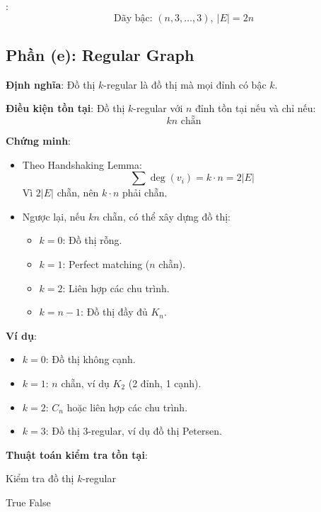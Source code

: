 \documentclass[a4paper,12pt]{article}
\theoremstyle{plain}
\theoremstyle{definition}
\begin{document}
:
\[
\boxed{\text{Dãy bậc: } (n, 3, \ldots, 3), \ |E| = 2n}
\]

\subsection*{Phần (e): Regular Graph}

\textbf{Định nghĩa}: Đồ thị \( k \)-regular là đồ thị mà mọi đỉnh có bậc \( k \).

\textbf{Điều kiện tồn tại}: Đồ thị \( k \)-regular với \( n \) đỉnh tồn tại nếu và chỉ nếu:
\[
kn \text{ chẵn}
\]

\textbf{Chứng minh}:
\begin{itemize}
    \item Theo Handshaking Lemma:
    \[
    \sum \deg(v_i) = k \cdot n = 2|E|
    \]
    Vì \( 2|E| \) chẵn, nên \( k \cdot n \) phải chẵn.
    \item Ngược lại, nếu \( kn \) chẵn, có thể xây dựng đồ thị:
    \begin{itemize}
        \item \( k=0 \): Đồ thị rỗng.
        \item \( k=1 \): Perfect matching (\( n \) chẵn).
        \item \( k=2 \): Liên hợp các chu trình.
        \item \( k=n-1 \): Đồ thị đầy đủ \( K_n \).
    \end{itemize}
\end{itemize}

\textbf{Ví dụ}:
\begin{itemize}
    \item \( k=0 \): Đồ thị không cạnh.
    \item \( k=1 \): \( n \) chẵn, ví dụ \( K_2 \) (2 đỉnh, 1 cạnh).
    \item \( k=2 \): \( C_n \) hoặc liên hợp các chu trình.
    \item \( k=3 \): Đồ thị 3-regular, ví dụ đồ thị Petersen.
\end{itemize}

\textbf{Thuật toán kiểm tra tồn tại}:
\begin{algorithm}
\caption{Kiểm tra đồ thị \( k \)-regular}
\begin{algorithmic}
     \Return True
    \Else \Return False
    \EndIf
\EndFunction
\end{algorithmic}
\end{algorithm}
\end{document}
